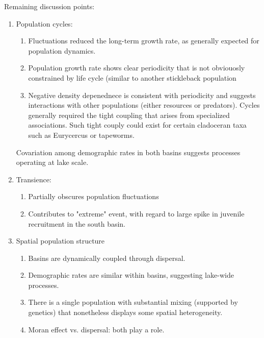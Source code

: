 Remaining discussion points:
\begin{enumerate}[label=(\alph*)]
\item
Population cycles: 
  \begin{enumerate}
  \item
  Fluctuations reduced the long-term growth rate,
  as generally expected for population dynamics.
  \item 
  Population growth rate shows clear periodicity that is not obviouosly constrained by
  life cycle (similar to another stickleback population
  \item
  Negative density depenednece is consistent with periodicity and suggests interactions 
  with other populations (either resources or predators).
  Cycles generally required the tight coupling that arises from specialized associations.
  Such tight couply could exist for certain cladoceran taxa such as Eurycercus or 
  tapeworms. 
  \end{enumerate}
  Covariation among demographic rates in both basins 
  suggests processes operating at lake scale.
\item
Transience: 
  \begin{enumerate}
  \item 
  Partially obscures population fluctuations
  \item
  Contributes to "extreme" event, with regard to large spike in juvenile recruitment
  in the south basin.
  \end{enumerate}
\item
Spatial population structure
  \begin{enumerate}
  \item 
  Basins are dynamically coupled through dispersal.
  \item
  Demographic rates are similar within basins, suggesting lake-wide processes.
  \item
  There is a single population with substantial mixing (supported by genetics) that 
  nonetheless displays some spatial heterogeneity.
  \item
  Moran effect vs. dispersal: both play a role.
  \end{enumerate}
\end{enumerate}